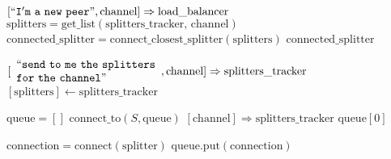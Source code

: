 \documentclass{article}
\begin{document}
\pagestyle{empty}

\newcommand{\send}{\Rightarrow}
\newcommand{\sendto}{\rightarrow}
\algrenewcommand{}
\algrenewcommand\textproc{\textrm}

\begin{algorithmic}

  
  \State $[``\mathtt{I'm~a~new~peer}", \text{channel}] \send \text{load\_balancer}$
  \State $\text{splitters} = \text{get\_list}(\text{splitters\_tracker, channel})$
  \State $\text{connected\_splitter} = \text{connect\_closest\_splitter}(\text{splitters})$
  \State \Return $\text{connected\_splitter}$
  \EndFunction

  
  \State $[\begin{array}{l}``\mathtt{send~to~me~the~splitters}\\\mathtt{for~the~channel}"\end{array}, \text{channel}] \send \text{splitters\_tracker}$
  \State \Return $[\mathrm{splitters}] \gets \mathrm{splitters\_tracker}$
  \EndFunction

  \State $\mathrm{queue}=[]$
  \State $\text{connect\_to}(S, \text{queue})$
  \EndFor 
  \State $[\text{channel}] \send \text{splitters\_tracker}$
  \State \Return $\mathrm{queue}[0]$
  \EndFunction

  \algrenewcommand{}

  \State $\text{connection} = \mathrm{connect}(\text{splitter})$
  \State $\text{queue}.\text{put}(\text{connection})$
  \EndIf
  \EndFunction

  \EndProcedure

\end{algorithmic}
\end{document}
